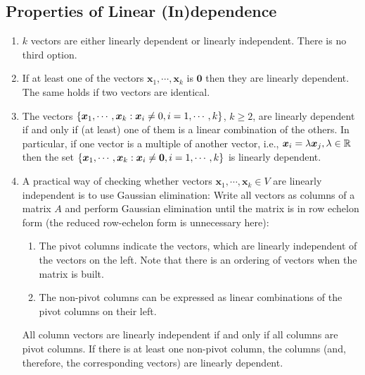 \subsection{Properties of Linear (In)dependence}
\begin{enumerate}
    \item $k$ vectors are either linearly dependent or linearly independent. There is no third option.
    \hfill \cite{mfml/book/mml/Deisenroth-Faisal-Ong}

    \item If at least one of the vectors $\bm{x}_1, \cdots , \bm{x}_k$ is $\bm{0}$ then they are linearly dependent. 
    The same holds if two vectors are identical.
    \hfill \cite{mfml/book/mml/Deisenroth-Faisal-Ong}

    \item The vectors $\left\{\bm{x}_1, \cdots , \bm{x}_k : \bm{x}_i \neq 0, i = 1, \cdots , k\right\}$, $k \geq 2$, are linearly dependent if and only if (at least) one of them is a linear combination of the others. 
    In particular, if one vector is a multiple of another vector, i.e., $\bm{x}_i = \lambda \bm{x}_j , \lambda \in \mathbb{R}$ then the set $\left\{\bm{x}_1, \cdots , \bm{x}_k : \bm{x}_i \neq \bm{0}, i = 1, \cdots , k\right\}$ is linearly dependent.
    \hfill \cite{mfml/book/mml/Deisenroth-Faisal-Ong}

    \item A practical way of checking whether vectors $\bm{x}_1, \cdots , \bm{x}_k \in V$ are linearly independent is to use Gaussian elimination: 
    Write all vectors as columns of a matrix $A$ and perform Gaussian elimination until the matrix is in row echelon form (the reduced row-echelon form is unnecessary here):
    \hfill \cite{mfml/book/mml/Deisenroth-Faisal-Ong}
    \begin{enumerate}
        \item The pivot columns indicate the vectors, which are linearly independent of the vectors on the left. Note that there is an ordering of vectors when the matrix is built.
        \hfill \cite{mfml/book/mml/Deisenroth-Faisal-Ong}

        \item The non-pivot columns can be expressed as linear combinations of the pivot columns on their left.
        \hfill \cite{mfml/book/mml/Deisenroth-Faisal-Ong}
    \end{enumerate}

    All column vectors are linearly independent if and only if all columns are pivot columns. If there is at least one non-pivot column, the columns (and, therefore, the corresponding vectors) are linearly dependent.
    \hfill \cite{mfml/book/mml/Deisenroth-Faisal-Ong}


\end{enumerate}
